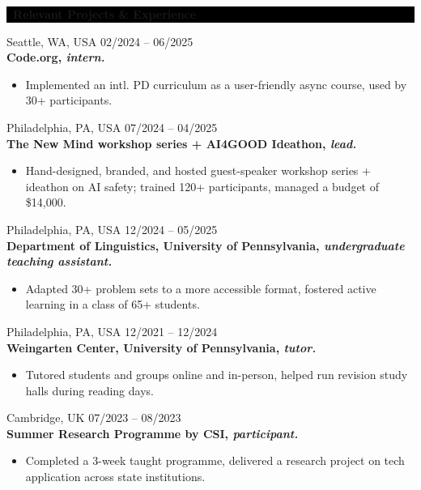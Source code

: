 \documentclass[10pt]{article}
\begin{document}
\noindent\colorbox{black}{\parbox{\textwidth}{\color{white}\textbf{\faCogs\ Relevant Projects \& Experience}}}
Seattle, WA, USA \hfill 02/2024 – 06/2025\\
\textbf{Code.org, \textit{intern.}}
\begin{itemize}[label=$\blacktriangleright$, leftmargin=20pt, topsep=0pt, itemsep=0pt]
\item Implemented an intl. PD curriculum as a user-friendly async course, used by 30+ participants.
\end{itemize}
\vspace{0.1in}
Philadelphia, PA, USA \hfill 07/2024 – 04/2025\\
\textbf{The New Mind workshop series + AI4GOOD Ideathon, \textit{lead.}}
\begin{itemize}[label=$\blacktriangleright$, leftmargin=20pt, topsep=0pt, itemsep=0pt]
\item Hand-designed, branded, and hosted guest-speaker workshop series + ideathon on AI safety; trained 120+ participants, managed a budget of \$14,000.
\end{itemize}
\vspace{0.1in}
Philadelphia, PA, USA \hfill 12/2024 – 05/2025\\
\textbf{Department of Linguistics, University of Pennsylvania, \textit{undergraduate teaching assistant.}}
\begin{itemize}[label=$\blacktriangleright$, leftmargin=20pt, topsep=0pt, itemsep=0pt]
\item Adapted 30+ problem sets to a more accessible format, fostered active learning in a class of 65+ students.
\end{itemize}
\vspace{0.1in}
Philadelphia, PA, USA \hfill 12/2021 – 12/2024\\
\textbf{Weingarten Center, University of Pennsylvania, \textit{tutor.}}
\begin{itemize}[label=$\blacktriangleright$, leftmargin=20pt, topsep=0pt, itemsep=0pt]
\item Tutored students and groups online and in-person, helped run revision study halls during reading days.
\end{itemize}
\vspace{0.1in}
Cambridge, UK \hfill 07/2023 – 08/2023\\
\textbf{Summer Research Programme by CSI, \textit{participant.}}
\begin{itemize}[label=$\blacktriangleright$, leftmargin=20pt, topsep=0pt, itemsep=0pt]
\item Completed a 3-week taught programme, delivered a research project on tech application across state institutions.
\end{itemize}
\end{document}
